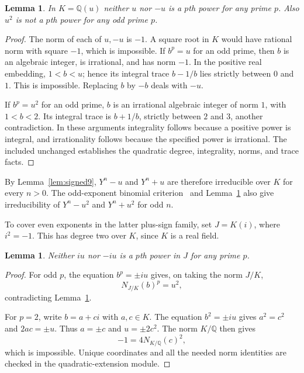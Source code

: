 \documentclass[11pt]{article}
\newtheorem{lemma}[theorem]{Lemma}
\newcommand{\Q}{\mathbb Q}
\begin{document}
\begin{lemma}\label{lem:gold9}
In $K=\Q(u)$ neither $u$ nor $-u$ is a $p$th power for any prime $p$.
Also $u^2$ is not a $p$th power for any odd prime $p$.
\end{lemma}

\begin{proof}
The norm of each of $u,-u$ is $-1$. A square root in $K$ would have
rational norm with square $-1$, which is impossible. If $b^p=u$ for an
odd prime, then $b$ is an algebraic integer, is irrational, and has norm
$-1$. In the positive real embedding, $1<b<u$; hence its integral trace
$b-1/b$ lies strictly between $0$ and $1$. This is impossible.
Replacing $b$ by $-b$ deals with $-u$.

If $b^p=u^2$ for an odd prime, $b$ is an irrational algebraic integer
of norm $1$, with $1<b<2$. Its integral trace is $b+1/b$, strictly
between $2$ and $3$, another contradiction. In these arguments
integrality follows because a positive power is integral, and
irrationality follows because the specified power is irrational.
The included unchanged  establishes the
quadratic degree, integrality, norms, and trace facts.
\end{proof}

By Lemma~\ref{lem:signed9}, $Y^n-u$ and $Y^n+u$ are therefore
irreducible over $K$ for every $n>0$. The odd-exponent binomial
criterion~\cite{kummer} and Lemma~\ref{lem:gold9} also give irreducibility
of $Y^n-u^2$ and $Y^n+u^2$ for odd $n$.

To cover even exponents in the latter plus-sign family, set $J=K(i)$,
where $i^2=-1$. This has degree two over $K$, since $K$ is a real field.

\begin{lemma}\label{lem:imaginary9}
Neither $iu$ nor $-iu$ is a $p$th power in $J$ for any prime $p$.
\end{lemma}

\begin{proof}
For odd $p$, the equation $b^p=\pm iu$ gives, on taking the norm $J/K$,
\[
 N_{J/K}(b)^p=u^2,
\]
contradicting Lemma~\ref{lem:gold9}.

For $p=2$, write $b=a+ci$ with $a,c\in K$. The equation $b^2=\pm iu$
gives $a^2=c^2$ and $2ac=\pm u$. Thus $a=\pm c$ and $u=\pm2c^2$.
The norm $K/\Q$ then gives
\[
 -1=4N_{K/\Q}(c)^2,
\]
which is impossible. Unique coordinates and all the needed norm
identities are checked in the quadratic-extension module.
\end{proof}
\end{document}
